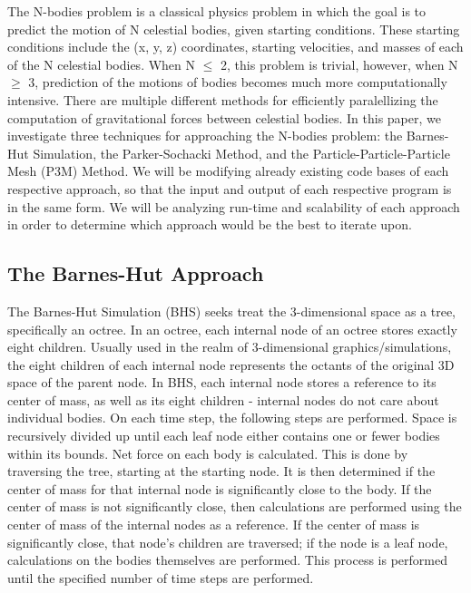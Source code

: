 \documentclass[11pt]{article}
\begin{document}
The N-bodies problem is a classical physics problem in which the goal is to predict the motion of N celestial bodies, given starting conditions. 
These starting conditions include the (x, y, z) coordinates, starting velocities, and masses of each of the N celestial bodies. When N $\le$ 2, this problem is trivial, however, when N $\ge$ 3, prediction of the motions of bodies becomes much more computationally intensive. There are multiple different methods for efficiently paralellizing the computation of gravitational forces between celestial bodies.
\newline \newline
In this paper, we investigate three techniques for approaching the N-bodies problem: the Barnes-Hut Simulation, the Parker-Sochacki Method, and the Particle-Particle-Particle Mesh (P3M) Method. We will be modifying already existing code bases of each respective approach, so that the input and output of each respective program is in the same form. We will be analyzing run-time and scalability of each approach in order to determine which approach would be the best to iterate upon.
\begin{center}
\section*{The Barnes-Hut Approach}
\end{center}
The Barnes-Hut Simulation (BHS) seeks treat the 3-dimensional space as a tree, specifically an octree. In an octree, each internal node of an octree stores exactly eight children. Usually used in the realm of 3-dimensional graphics/simulations, the eight children of each internal node represents the octants of the original 3D space of the parent node. In BHS, each internal node stores a reference to its center of mass, as well as its eight children - internal nodes do not care about individual bodies. 
\newline \newline 
On each time step, the following steps are performed. Space is recursively divided up until each leaf node either contains one or fewer bodies within its bounds. Net force on each body is calculated. This is done by traversing the tree, starting at the starting node. It is then determined if the center of mass for that internal node is significantly close to the body. If the center of mass is not significantly close, then calculations are performed using the center of mass of the internal nodes as a reference. If the center of mass is significantly close, that node's children are traversed; if the node is a leaf node, calculations on the bodies themselves are performed. This process is performed until the specified number of time steps are performed.
\end{document}
